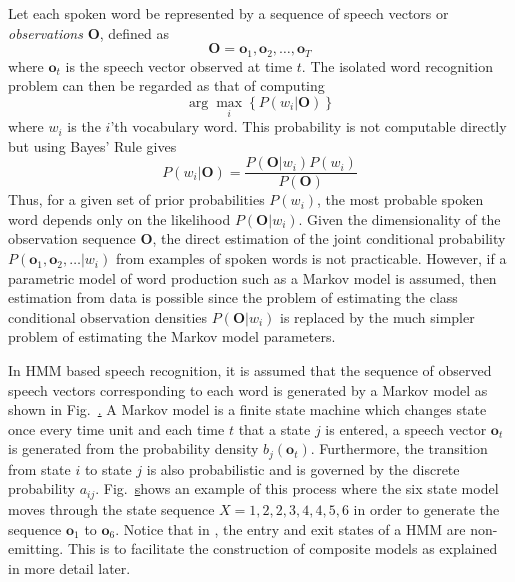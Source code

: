 
Let each spoken word be represented by a sequence of speech vectors or {\it
observations} $\bm{O}$,  defined as
\begin{equation}
\bm{O} = \bm{o}_1, \bm{o}_2, \ldots, \bm{o}_T
\end{equation}
where $\bm{o}_t$ is the speech vector observed at time $t$.  The
isolated word recognition problem can then be regarded as that of
computing
\begin{equation}  \label{e:2}
 \arg\max_i \left\{ P(w_i | \bm{O}) \right\}
\end{equation}
where $w_i$ is the $i$'th vocabulary word.  This probability
is not computable directly but using Bayes' Rule gives
\begin{equation} \label{e:3}
  P(w_i | \bm{O}) = \frac{P(\bm{O}|w_i) P(w_i)}{P(\bm{O})}
\end{equation}
Thus, for a given set of prior probabilities $P(w_i)$, the most
probable spoken word depends only on the likelihood $P(\bm{O}|w_i) $.
Given the dimensionality of the observation sequence $\bm{O}$, the
direct estimation of the joint conditional probability 
$P(\bm{o}_1,\bm{o}_2,\ldots | w_i)$ from examples of spoken words
is not practicable. However, if a parametric model of word production
such as a Markov model
is assumed, then estimation from data is possible since the problem
of estimating the class conditional observation densities $P(\bm{O}|w_i)$
is replaced by the much simpler problem of estimating the Markov
model parameters.

In HMM based speech recognition, it is assumed that the sequence of
observed speech vectors corresponding to each word is generated
by a Markov model as shown in Fig.~\href{f:markovgen}.
A Markov model is a finite state machine which changes state
once every time unit and each time $t$ that a state $j$ is entered, a
speech vector $\bm{o}_t$ is generated from the probability density
$b_j(\bm{o}_t)$.  Furthermore, the transition from state $i$ to state $j$
is also probabilistic and is governed by the discrete probability $a_{ij}$.
Fig.~\href{f:markovgen} shows an example of this process where the six state
model moves through the state sequence $X=1,2,2,3,4,4,5,6$ in
order to generate the sequence $\bm{o}_1$ to $\bm{o}_6$. Notice that
in \HTK, the entry and exit states of a HMM are non-emitting.  This
is to facilitate the construction of composite models as explained in
more detail later.


